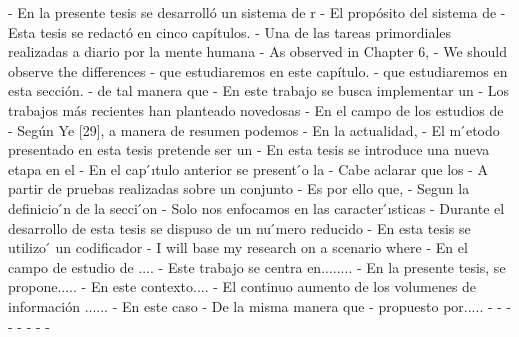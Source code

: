 - En la presente tesis se desarrolló un sistema de r
- El propósito del sistema de
- Esta tesis se redactó en cinco capítulos. 
- Una de las tareas primordiales realizadas a diario por la mente humana 
- As observed in Chapter 6, 
- We should observe the differences
- que estudiaremos en este capítulo.
- que estudiaremos en esta sección.
- de tal manera que 
- En este trabajo se busca implementar un 
- Los trabajos más recientes han planteado novedosas
- En el campo de los estudios de 
- Según Ye [29], a manera de resumen podemos
- En la actualidad,
- El m ́etodo presentado en esta tesis pretende ser un 
- En esta tesis se introduce una nueva etapa en el 
- En el cap ́ıtulo anterior se present ́o la
- Cabe aclarar que los 
- A partir de pruebas realizadas sobre un conjunto 
- Es por ello que,
- Segun la definicio ́n de la secci ́on
- Solo nos enfocamos en las caracter ́ısticas
- Durante el desarrollo de esta tesis se dispuso de un nu ́mero reducido 
- En esta tesis se utilizo ́ un codificador
- I will base my research on a scenario where
- En el campo de estudio de ....
- Este trabajo se centra en........
- En la presente tesis, se propone.....
- En este contexto....
- El continuo aumento de los volumenes de información ......
- En este caso
- De la misma manera que
- propuesto por.....
- 
- 
- 
- 
- 
- 
- 
- 


